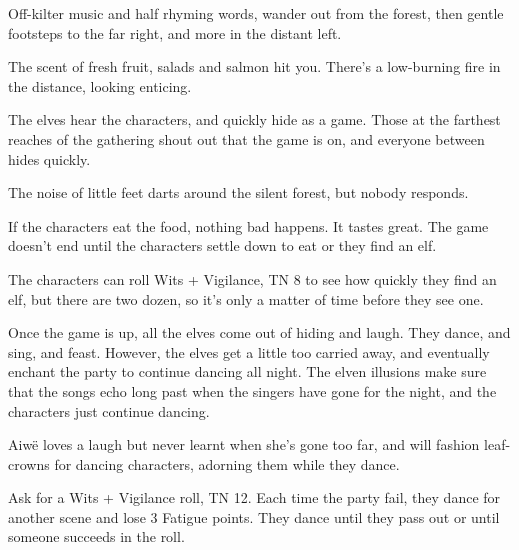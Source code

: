 \begin{multicols}{2}
\begin{boxtext}

	Off-kilter music and half rhyming words, wander out from the forest, then gentle footsteps to the far right, and more in the distant left.

	The scent of fresh fruit, salads and salmon hit you.  There's a low-burning fire in the distance, looking enticing.

\end{boxtext}

The elves hear the characters, and quickly hide as a game.  Those at the farthest reaches of the gathering shout out that the game is on, and everyone between hides quickly.

\begin{boxtext}

	The noise of little feet darts around the silent forest, but nobody responds.

\end{boxtext}

If the characters eat the food, nothing bad happens.  It tastes great.  The game doesn't end until the characters settle down to eat or they find an elf.

The characters can roll Wits + Vigilance, TN 8 to see how quickly they find an elf, but there are two dozen, so it's only a matter of time before they see one.

Once the game is up, all the elves come out of hiding and laugh.  They dance, and sing, and feast.  However, the elves get a little too carried away, and eventually enchant the party to continue dancing all night.  The elven illusions make sure that the songs echo long past when the singers have gone for the night, and the characters just continue dancing.
 

\elf

Aiw\"{e} loves a laugh but never learnt when she's gone too far, and will fashion leaf-crowns for dancing characters, adorning them while they dance.

\columnbreak


\elf


\elvenenchanter

Ask for a Wits + Vigilance roll, TN 12.  Each time the party fail, they dance for another scene and lose 3 Fatigue points.  They dance until they pass out or until someone succeeds in the roll.


\end{multicols}
